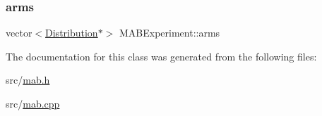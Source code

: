 \subsubsection{\texorpdfstring{arms}{arms}}
{\footnotesize\ttfamily vector$<$\mbox{\hyperlink{class_distribution}{Distribution}}$\ast$$>$ M\+A\+B\+Experiment\+::arms}



The documentation for this class was generated from the following files\+:\begin{DoxyCompactItemize}
\item 
src/\mbox{\hyperlink{mab_8h}{mab.\+h}}\item 
src/\mbox{\hyperlink{mab_8cpp}{mab.\+cpp}}\end{DoxyCompactItemize}
